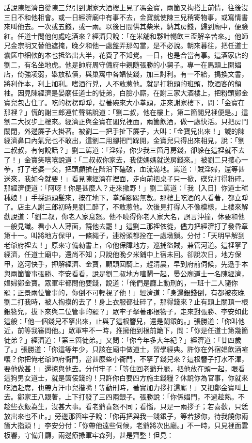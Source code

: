 \begin{showcontents}{}
話說陳經濟自從陳三兒引到謝家大酒樓上見了馮金寶，兩箇又抅搭上前情，往後沒三日不和他相會。或一日經濟廟中有事不去，金寶就使陳三兒稍寄物事，或寫情書來叫他去。一次或五錢，或一兩。以後日間供其柴米，納其房錢，歸到廟中，便臉紅。任道士問他何處吃酒來？經濟只說：「在米舖和夥計暢飲三盃解辛苦來。」他師兄金宗明又替他遮掩，晚夕和他一處盤弄那勾當，是不必說。朝來暮往，把任道士囊篋中細軟的本也抵盜出大半，花費了不知覺。一日，也是合當有事。這酒家店的劉二，有名坐地虎。他是帥府周守備府中親隨張勝的小舅子。專一在馬頭上開娼店，倚強凌弱，舉放私債，與巢窩中各娼使錢，加三討利。有一不給，搗換文書，將利作本，利上加利。嗜酒行兇，人不敢惹他。就是打粉頭的班頭，欺酒客的領袖。因見陳經濟是晏廟任道士的徒弟，白臉小廝，在謝三家大酒樓上，把粉頭鄭金寶兒包占住了。吃的楞楞睜睜，提著碗來大小拳頭，走來謝家樓下，問：「金寶在那裡？」慌的謝三郎連忙聲諾說道：「劉二叔，他在樓上，第二箇閣兒裡便是。」這劉二大扠步上樓來。經濟正與金寶在閣兒裡面，兩箇飲酒，做一處快活。只把房門關閉，外邊簾子大掛著。被劉二一把手扯下簾子，大叫：「金寶兒出來！」諕的陳經濟鼻口內氣兒也不敢出，這劉二用腳把門跺開，金寶兒只得出來相見，說：「劉二叔叔，有何說話？」劉二罵道：「淫婦，你少我三箇月房錢，卻躲在這裡就不去了！」金寶笑嘻嘻說道：「二叔叔你家去，我使媽媽就送房錢來。」被劉二只摟心一拳，打了老婆一交，把頭顱搶在階沿下磕破，血流滿地。罵道：「賊淫婦，還等甚送來，我如今就要！」看見陳經濟在裡面，走向前把桌子只一掀，碟兒打得粉碎。那經濟便道：「阿呀！你是甚麼人？走來撒野！」劉二罵道：「我｛入日｝你道士秫秫娘！」手採過頭髮來，按在地下，拳踵腳踢無數。那樓上吃酒的人看著，都立睜了。店主人謝三郎初時見劉二醉了，不敢惹他。次後見打得人不像模樣，上樓來解勸說道：「劉二叔，你老人家息怒。他不曉得你老人家大名，誤言沖撞，休要和他一般見識。看小人人薄面，饒他去罷！」這劉二那裡依從，儘力把經濟打了發昏章第十一。叫將地方保甲，一條繩子，連粉頭都拴在一處墩鎖。分付：「天明早解到老爺府裡去！」原來守備勑書上，命他保障地方，巡捕盜賊，兼管河道。這裡拏了經濟，任道士廟中，還尚不知；只說他晚夕米鋪中上宿未回。卻說次日，地方保甲，巡河快手，押解經濟、金寶，顧頭回騎上，趕清晨，早到府前伺候，先遞手本與兩箇管事張勝、李安看看，說是劉二叔地方喧鬧一起，晏公廟道士一名陳經濟，娼婦鄭金寶。眾軍牢都問他要錢，說道：「俺們是廳上動刑的，一班十二人隨你罷；正景兩位管事的，你倒不可輕視了他！」經濟道：「身邊銀錢倒，有都被夜晚劉二打我時，被人掏摸的去了！身上衣服都扯碎了，那得錢來？止有頭上關頂一根銀簪兒，拔下來與二位管事的罷？」眾牢子拏著那根簪子，走來對張勝、李安如此這般：「他一個錢兒不拏出來，止與了這根簪兒，還是鬧銀的。」張勝道：「你叫他近，前等我審問他。」眾軍牢不一時，推擁他到根前跪下，問：「你是任道士第幾箇徒弟？」經濟道：「第三箇徒弟。」又問：「你今年多大年紀？」經濟道：「廿四歲了。」張勝道：「你這等年少，只該在廟中做道士，習學經典。許你在外宿娼飲酒喧嚷？你把俺老爺帥府衙門，當甚麼些小衙門，不拏了錢兒來？這根簪子打水不渾，要他做甚！」還掠與他去。分付牢子：「等住回老爺升廳，把他放在頭一起，眼看這狗男女道士，就是箇佞錢的！只許你白要四方施主錢糧？休說你為官事，你就來吃酒赴席，也帶方汗巾兒揩嘴！等動刑時，著實加力拶打這廝！」又把鄭金寶叫上去。鄭家王八跟著，上下打發了三四兩銀子。張勝說：「你係娼門，不過趁熟。不趁些衣飯為生，沒甚大事。看老爺喜怒不同；看惱，只是一兩拶子；若喜歡，只恁放出來也不止。」旁邊那箇牢子說：「你再把與我一錢銀子，等若拶你，待我饒你兩箇大指頭！」李安分付：「你帶他遠些伺候，老爺將次出廳。」不一時，只見裡面雲板響，守備升廳，兩邊療掾軍牢森列，甚是齊整！但見：


\end{showcontents}
